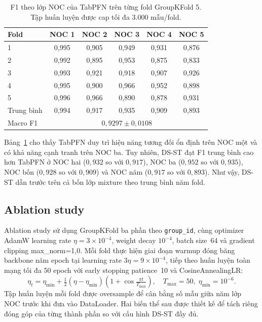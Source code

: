 \documentclass[12pt,a4paper]{article}
\begin{document}
\begin{table}[H]
\centering
\caption{F1 theo lớp NOC của TabPFN trên từng fold GroupKFold 5. Tập huấn luyện được cap tối đa 3.000 mẫu/fold.}
\label{tab:perclass_tabpfn}
\small
\begin{tabular}{lccccc}
\toprule
\textbf{Fold} & \textbf{NOC 1} & \textbf{NOC 2} & \textbf{NOC 3} & \textbf{NOC 4} & \textbf{NOC 5} \\
\midrule
1 & 0,995 & 0,905 & 0,949 & 0,931 & 0,876 \\
2 & 0,992 & 0,895 & 0,953 & 0,875 & 0,833 \\
3 & 0,993 & 0,921 & 0,918 & 0,907 & 0,926 \\
4 & 0,995 & 0,900 & 0,966 & 0,952 & 0,898 \\
5 & 0,996 & 0,966 & 0,890 & 0,878 & 0,931 \\
\midrule
Trung bình & 0,994 & 0,917 & 0,935 & 0,909 & 0,893 \\
\midrule
Macro F1 & \multicolumn{5}{c}{$0{,}9297\pm0{,}0108$} \\
\bottomrule
\end{tabular}
\end{table}

Bảng~\ref{tab:perclass_tabpfn} cho thấy TabPFN duy trì hiệu năng tương đối ổn định trên NOC một và có khả năng cạnh tranh trên NOC ba. Tuy nhiên, DS-ST đạt F1 trung bình cao hơn TabPFN ở NOC hai ($0{,}932$ so với $0{,}917$), NOC ba ($0{,}952$ so với $0{,}935$), NOC bốn ($0{,}928$ so với $0{,}909$) và NOC năm ($0{,}917$ so với $0{,}893$). Như vậy, DS-ST dẫn trước trên cả bốn lớp mixture theo trung bình năm fold.

\subsection{Ablation study}

Ablation study sử dụng GroupKFold ba phần theo \texttt{group\_id}, cùng optimizer AdamW learning rate $\eta=3\times10^{-4}$, weight decay $10^{-4}$, batch size~64 và gradient clipping max\_norm=1{,}0. Mỗi fold thực hiện giai đoạn warmup đóng băng backbone năm epoch tại learning rate $3\eta=9\times10^{-4}$, tiếp theo huấn luyện toàn mạng tối đa 50 epoch với early stopping patience~10 và CosineAnnealingLR:
\begin{equation}
\eta_t = \eta_{\min} + \tfrac{1}{2}\!\left(\eta - \eta_{\min}\right)\!\left(1 + \cos\tfrac{\pi t}{T_{\max}}\right),\quad T_{\max}=50,\;\eta_{\min}=10^{-6}.
\end{equation}
Tập huấn luyện mỗi fold được oversample để cân bằng số mẫu giữa năm lớp NOC trước khi đưa vào DataLoader. Hai biến thể sau được thiết kế để tách riêng đóng góp của từng thành phần so với cấu hình DS-ST đầy đủ.
\end{document}
